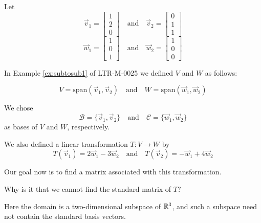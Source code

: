 \documentclass{ximera}
\begin{document}
\begin{exploration}\label{init:matlintransgeneral}
Let
$$\vec{v}_1=\begin{bmatrix}1\\2\\0\end{bmatrix}\quad\text{and}\quad\vec{v}_2=\begin{bmatrix}0\\1\\1\end{bmatrix}$$
$$\vec{w}_1=\begin{bmatrix}1\\0\\1\end{bmatrix}\quad\text{and}\quad\vec{w}_2=\begin{bmatrix}1\\0\\0\end{bmatrix}$$

In Example \ref{ex:subtosub1} of LTR-M-0025 we defined $V$ and $W$ as follows:

$$V=\text{span}(\vec{v}_1, \vec{v}_2)\quad\text{and}\quad W=\text{span}(\vec{w}_1, \vec{w}_2)$$

We chose
$$\mathcal{B}=\{\vec{v}_1, \vec{v}_2\}\quad\text{and}\quad\mathcal{C}=\{\vec{w}_1, \vec{w}_2\}$$
as bases of $V$ and $W$, respectively.

We also defined a linear transformation $T:V\rightarrow W$ by 
$$T(\vec{v}_1)=2\vec{w}_1-3\vec{w}_2\quad\text{and} \quad T(\vec{v}_2)=-\vec{w}_1+4\vec{w}_2$$

Our goal now is to find a matrix associated with this transformation.  

Why is it that we cannot find the standard matrix of $T$?\begin{hint}{Here the domain is a two-dimensional subspace of $\mathbb{R}^3$, and such a subspace need not contain the standard basis vectors.}\end{hint} 


\end{exploration}
\end{document}
